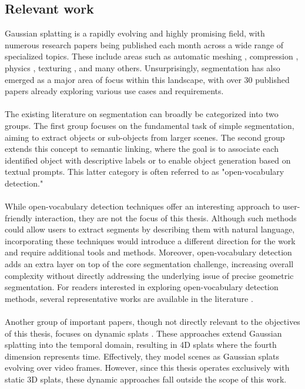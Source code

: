 \documentclass[12pt]{article}
\begin{document}
\subsection{Relevant work}
Gaussian splatting is a rapidly evolving and highly promising field, with numerous research papers being published each month across a wide range of specialized topics. These include areas such as automatic meshing \cite{automesh}, compression \cite{compression}, physics \cite{physics}, texturing \cite{texture}, and many others. Unsurprisingly, segmentation has also emerged as a major area of focus within this landscape, with over 30 published papers already exploring various use cases and requirements.
\\\\
The existing literature on segmentation can broadly be categorized into two groups. The first group focuses on the fundamental task of simple segmentation, aiming to extract objects or sub-objects from larger scenes. The second group extends this concept to semantic linking, where the goal is to associate each identified object with descriptive labels or to enable object generation based on textual prompts. This latter category is often referred to as "open-vocabulary detection."
\\\\
While open-vocabulary detection techniques offer an interesting approach to user-friendly interaction, they are not the focus of this thesis. Although such methods could allow users to extract segments by describing them with natural language, incorporating these techniques would introduce a different direction for the work and require additional tools and methods. Moreover, open-vocabulary detection adds an extra layer on top of the core segmentation challenge, increasing overall complexity without directly addressing the underlying issue of precise geometric segmentation. For readers interested in exploring open-vocabulary detection methods, several representative works are available in the literature \cite{vocab1, vocab2, vocab3}.
\\\\
Another group of important papers, though not directly relevant to the objectives of this thesis, focuses on dynamic splats \cite{dyn1,dyn2}. These approaches extend Gaussian splatting into the temporal domain, resulting in 4D splats where the fourth dimension represents time. Effectively, they model scenes as Gaussian splats evolving over video frames. However, since this thesis operates exclusively with static 3D splats, these dynamic approaches fall outside the scope of this work.
\end{document}
